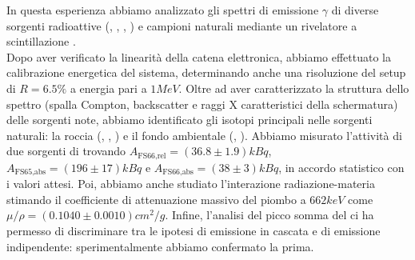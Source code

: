 In questa esperienza abbiamo analizzato gli spettri di emissione $\gamma$ di diverse sorgenti radioattive (, , , ) e campioni naturali mediante un rivelatore a scintillazione .  \\
Dopo aver verificato la linearità della catena elettronica, abbiamo effettuato la calibrazione energetica del sistema, determinando anche una risoluzione del setup di $ R = 6.5 \% $ a energia pari a $ 1 \unit{MeV} $.
Oltre ad aver caratterizzato la struttura dello spettro (spalla Compton, backscatter e raggi X caratteristici della schermatura) delle sorgenti note, abbiamo identificato gli isotopi principali nelle sorgenti naturali: la roccia (, , ) e il fondo ambientale (, ).
Abbiamo misurato l'attività di due sorgenti di  trovando $ A_\text{FS66,rel} = (36.8 \pm 1.9) \unit{kBq} $, $ A_\text{FS65,abs} = (196 \pm 17) \unit{kBq} $ e $ A_\text{FS66,abs} = (38 \pm 3) \unit{kBq} $, in accordo statistico con i valori attesi.
Poi, abbiamo anche studiato l’interazione radiazione-materia stimando il coefficiente di attenuazione massivo del piombo a $ 662 \unit{keV} $ come $ \mu/\rho = (0.1040 \pm 0.0010) \unit{cm^2/g} $.
Infine, l'analisi del picco somma del  ci ha permesso di discriminare tra le ipotesi di emissione in cascata e di emissione indipendente: sperimentalmente abbiamo confermato la prima.
